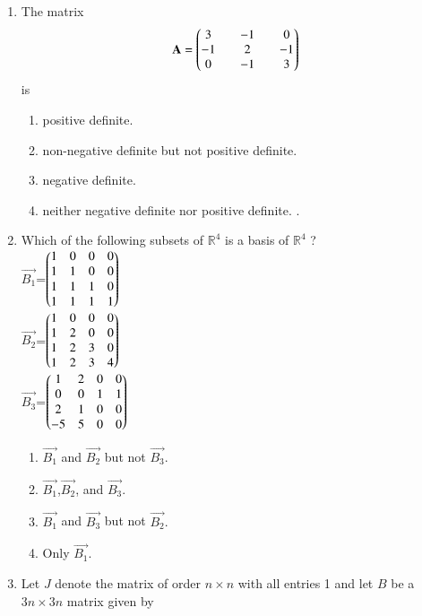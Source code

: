 \renewcommand{\theequation}{\theenumi}
\renewcommand{\thefigure}{\theenumi}
\renewcommand{\thetable}{\theenumi}
\begin{enumerate}[label=\thesection.\arabic*.,ref=\thesection.\theenumi]

\item The matrix
\begin{align}
\mathbf{A} = \begin{pmatrix}3 && -1 && 0 \\ -1 && 2 && -1\\ 0 && -1 && 3\end{pmatrix}
\end{align}
is
\begin{enumerate}
\item positive definite.
\item non-negative definite but not positive definite.
\item negative definite. 
\item neither negative definite nor positive definite. .
\end{enumerate}
%
\solution

\item Which of the following subsets of $\mathbb{R}^4$ is a basis of $\mathbb{R}^4$ ?\\
$\vec{B_1}$=$\begin{pmatrix}1&0&0&0\\1&1&0&0\\1&1&1&0\\1&1&1&1\end{pmatrix}$
\\
$\vec{B_2}$=$\begin{pmatrix}1&0&0&0\\1&2&0&0\\1&2&3&0\\1&2&3&4\end{pmatrix}$
\\
$\vec{B_3}$=$\begin{pmatrix}1&2&0&0\\0&0&1&1\\2&1&0&0\\-5&5&0&0\end{pmatrix}$
\begin{enumerate}
\item $\vec{B_1}$ and $\vec{B_2}$ but not $\vec{B_3}.$ 
\item $\vec{B_1}$,$\vec{B_2}$, and $\vec{B_3}.$
\item $\vec{B_1}$ and $\vec{B_3}$ but not $\vec{B_2}.$
\item Only $\vec{B_1}.$ 
\end{enumerate}
%
\solution

%
\item Let $J$ denote the matrix of order $n \times n$ with all
entries 1 and let $B$ be a $3n \times 3n$ matrix given by

\end{enumerate}
